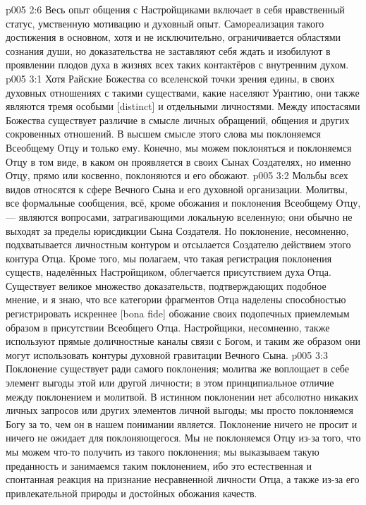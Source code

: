 \vs p005 2:6 Весь опыт общения с Настройщиками включает в себя нравственный статус, умственную мотивацию и духовный опыт. Самореализация такого достижения в основном, хотя и не исключительно, ограничивается областями сознания души, но доказательства не заставляют себя ждать и изобилуют в проявлении плодов духа в жизнях всех таких контактёров с внутренним духом.
\vs p005 3:1 Хотя Райские Божества со вселенской точки зрения едины, в своих духовных отношениях с такими существами, какие населяют Урантию, они также являются тремя особыми [distinct] и отдельными личностями. Между ипостасями Божества существует различие в смысле личных обращений, общения и других сокровенных отношений. В высшем смысле этого слова мы поклоняемся Всеобщему Отцу и только ему. Конечно, мы можем поклоняться и поклоняемся Отцу в том виде, в каком он проявляется в своих Сынах Создателях, но именно Отцу, прямо или косвенно, поклоняются и его обожают.
\vs p005 3:2 Мольбы всех видов относятся к сфере Вечного Сына и его духовной организации. Молитвы, все формальные сообщения, всё, кроме обожания и поклонения Всеобщему Отцу, --- являются вопросами, затрагивающими локальную вселенную; они обычно не выходят за пределы юрисдикции Сына Создателя. Но поклонение, несомненно, подхватывается личностным контуром и отсылается Создателю действием этого контура Отца. Кроме того, мы полагаем, что такая регистрация поклонения существ, наделённых Настройщиком, облегчается присутствием духа Отца. Существует великое множество доказательств, подтверждающих подобное мнение, и я знаю, что все категории фрагментов Отца наделены способностью регистрировать искреннее [bona fide] обожание своих подопечных приемлемым образом в присутствии Всеобщего Отца. Настройщики, несомненно, также используют прямые доличностные каналы связи с Богом, и таким же образом они могут использовать контуры духовной гравитации Вечного Сына.
\vs p005 3:3 Поклонение существует ради самого поклонения; молитва же воплощает в себе элемент выгоды этой или другой личности; в этом принципиальное отличие между поклонением и молитвой. В истинном поклонении нет абсолютно никаких личных запросов или других элементов личной выгоды; мы просто поклоняемся Богу за то, чем он в нашем понимании является. Поклонение ничего не просит и ничего не ожидает для поклоняющегося. Мы не поклоняемся Отцу из\hyp{}за того, что мы можем что\hyp{}то получить из такого поклонения; мы выказываем такую преданность и занимаемся таким поклонением, ибо это естественная и спонтанная реакция на признание несравненной личности Отца, а также из\hyp{}за его привлекательной природы и достойных обожания качеств.
